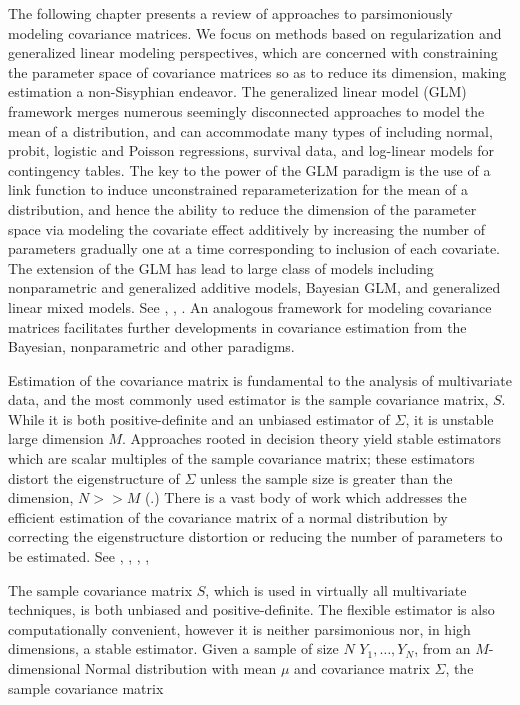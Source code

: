 \documentclass[12pt]{article}
\theoremstyle{definition}
\begin{document}
The following chapter presents a review of approaches to parsimoniously modeling covariance matrices. We focus on methods based on regularization and generalized linear modeling perspectives, which are concerned with constraining the parameter space of covariance matrices so as to reduce its dimension, making estimation a non-Sisyphian endeavor. The generalized linear model (GLM) framework \citet{McCullagh1989} merges numerous seemingly disconnected approaches to model the mean of a distribution, and can accommodate many types of including normal, probit, logistic and Poisson regressions, survival data, and log-linear models for contingency tables. The key to the power of the GLM paradigm is the use of a link function to induce unconstrained reparameterization for the mean of a distribution, and hence the ability to reduce the dimension of the parameter space via modeling the
covariate effect additively by increasing the number of parameters gradually one at a time corresponding to inclusion of each covariate. The extension of the GLM has lead to large class of models including nonparametric and generalized additive models, Bayesian GLM, and generalized linear mixed models. See \citet{hastie1990generalized},  \citet{dey2000generalized},  \citet{mcculloch2001generalized}. An analogous framework for modeling covariance matrices facilitates further developments in covariance estimation from the Bayesian, nonparametric and other paradigms.

\bigskip

Estimation of the covariance matrix is fundamental to the analysis of multivariate data, and the most commonly used estimator is the sample covariance matrix, $S$. While it is both positive-definite and an unbiased estimator of $\Sigma$, it is unstable large dimension $M$. Approaches rooted in decision theory yield stable estimators which are scalar multiples of the sample covariance matrix; these estimators distort the eigenstructure of $\Sigma$ unless the sample size is greater than the dimension, $N >> M$ (\citet{dempster1972covariance}.)  There is a vast body of work which addresses the efficient estimation of the covariance matrix of a normal distribution by correcting the eigenstructure distortion or reducing the number of parameters to be estimated. See \citet{stein1975estimation}, \citet{lin1985monte}, \citet{yang1994estimation}, \citet{daniels1999nonconjugate}, \citet{champion2003empirical} 

\bigskip

The sample covariance matrix $S$, which is used in virtually all multivariate techniques, is both unbiased and positive-definite. The flexible estimator is also computationally convenient, however it is neither parsimonious nor, in high dimensions, a stable estimator. Given a sample of size $N$ $Y_1,\dots , Y_N$, from an $M$-dimensional Normal distribution with mean $\mu$ and covariance matrix $\Sigma$, the sample covariance matrix
\end{document}
